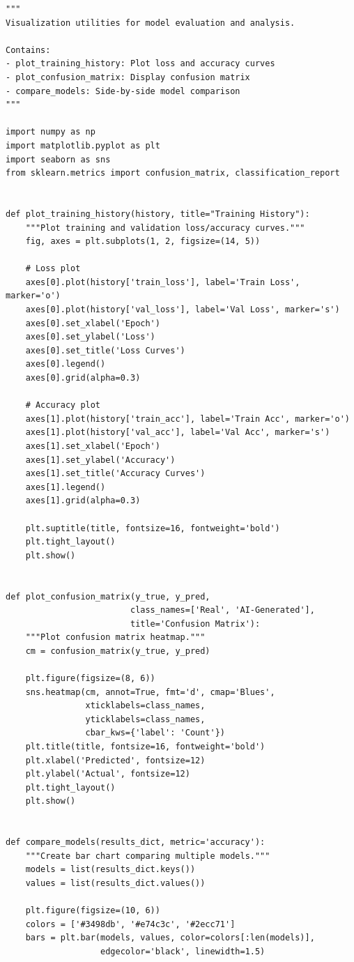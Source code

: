 \documentclass[man,12pt,letterpaper,donotrepeattitle,floatsintext]{apa7}
\begin{document}
\begin{lstlisting}[style=pythonstyle]
"""
Visualization utilities for model evaluation and analysis.

Contains:
- plot_training_history: Plot loss and accuracy curves
- plot_confusion_matrix: Display confusion matrix
- compare_models: Side-by-side model comparison
"""

import numpy as np
import matplotlib.pyplot as plt
import seaborn as sns
from sklearn.metrics import confusion_matrix, classification_report


def plot_training_history(history, title="Training History"):
    """Plot training and validation loss/accuracy curves."""
    fig, axes = plt.subplots(1, 2, figsize=(14, 5))
    
    # Loss plot
    axes[0].plot(history['train_loss'], label='Train Loss', marker='o')
    axes[0].plot(history['val_loss'], label='Val Loss', marker='s')
    axes[0].set_xlabel('Epoch')
    axes[0].set_ylabel('Loss')
    axes[0].set_title('Loss Curves')
    axes[0].legend()
    axes[0].grid(alpha=0.3)
    
    # Accuracy plot
    axes[1].plot(history['train_acc'], label='Train Acc', marker='o')
    axes[1].plot(history['val_acc'], label='Val Acc', marker='s')
    axes[1].set_xlabel('Epoch')
    axes[1].set_ylabel('Accuracy')
    axes[1].set_title('Accuracy Curves')
    axes[1].legend()
    axes[1].grid(alpha=0.3)
    
    plt.suptitle(title, fontsize=16, fontweight='bold')
    plt.tight_layout()
    plt.show()


def plot_confusion_matrix(y_true, y_pred, 
                         class_names=['Real', 'AI-Generated'], 
                         title='Confusion Matrix'):
    """Plot confusion matrix heatmap."""
    cm = confusion_matrix(y_true, y_pred)
    
    plt.figure(figsize=(8, 6))
    sns.heatmap(cm, annot=True, fmt='d', cmap='Blues',
                xticklabels=class_names,
                yticklabels=class_names,
                cbar_kws={'label': 'Count'})
    plt.title(title, fontsize=16, fontweight='bold')
    plt.xlabel('Predicted', fontsize=12)
    plt.ylabel('Actual', fontsize=12)
    plt.tight_layout()
    plt.show()


def compare_models(results_dict, metric='accuracy'):
    """Create bar chart comparing multiple models."""
    models = list(results_dict.keys())
    values = list(results_dict.values())
    
    plt.figure(figsize=(10, 6))
    colors = ['#3498db', '#e74c3c', '#2ecc71']
    bars = plt.bar(models, values, color=colors[:len(models)], 
                   edgecolor='black', linewidth=1.5)
    

\end{lstlisting}
\end{document}
